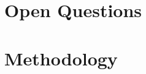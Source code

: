 \documentclass[11pt]{article}
\begin{document}
\section{Open Questions}

\section{Methodology}



\end{document}
